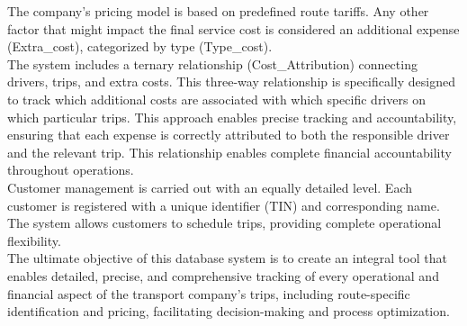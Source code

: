 \documentclass[11pt, a4paper]{article}
\begin{document}
The company's pricing model is based on predefined route tariffs. Any other factor that might impact the final service cost is considered an additional expense (Extra\_cost), categorized by type (Type\_cost). \\

The system includes a ternary relationship (Cost\_Attribution) connecting drivers, trips, and extra costs. This three-way relationship is specifically designed to track which additional costs are associated with which specific drivers on which particular trips. 
This approach enables precise tracking and accountability, ensuring that each expense is correctly attributed to both the responsible driver and the relevant trip. This relationship enables complete financial accountability throughout operations. \\

Customer management is carried out with an equally detailed level. Each customer is registered with a unique identifier (TIN) and corresponding name. The system allows customers to schedule trips, providing 
complete operational flexibility. \\

The ultimate objective of this database system is to create an integral tool that enables detailed, precise, and comprehensive tracking of every operational and financial aspect of the transport company's trips, 
including route-specific identification and pricing, facilitating decision-making and process optimization. \\

\newpage

\end{document}
